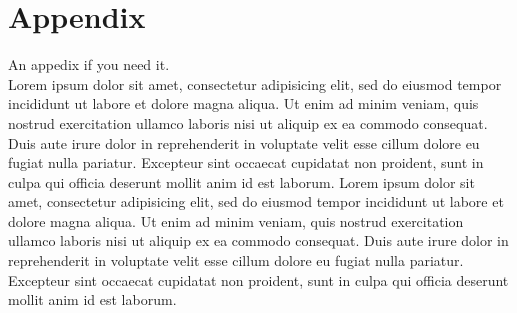 
\chapter*{Appendix}
\label{chap:appendix}

  An appedix if you need it. ~\\

  Lorem ipsum dolor sit amet, consectetur adipisicing elit, sed do eiusmod
  tempor incididunt ut labore et dolore magna aliqua. Ut enim ad minim veniam,
  quis nostrud exercitation ullamco laboris nisi ut aliquip ex ea commodo
  consequat. Duis aute irure dolor in reprehenderit in voluptate velit esse
  cillum dolore eu fugiat nulla pariatur. Excepteur sint occaecat cupidatat non
  proident, sunt in culpa qui officia deserunt mollit anim id est laborum.
  Lorem ipsum dolor sit amet, consectetur adipisicing elit, sed do eiusmod
  tempor incididunt ut labore et dolore magna aliqua. Ut enim ad minim veniam,
  quis nostrud exercitation ullamco laboris nisi ut aliquip ex ea commodo
  consequat. Duis aute irure dolor in reprehenderit in voluptate velit esse
  cillum dolore eu fugiat nulla pariatur. Excepteur sint occaecat cupidatat non
  proident, sunt in culpa qui officia deserunt mollit anim id est laborum.